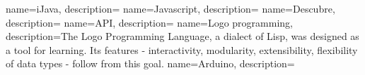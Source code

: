 
%



{
        name=iJava,
        description={}
}
{
        name=Javascript,
        description={}
}
{
        name=Descubre,
        description={}
}
{
        name=API,
        description={}
}
{
        name=Logo programming,
        description={The Logo Programming Language, a dialect of Lisp, was designed as a tool for learning. Its features - interactivity, modularity, extensibility, flexibility of data types - follow from this goal.}
}
{
        name=Arduino,
        description={}
}
